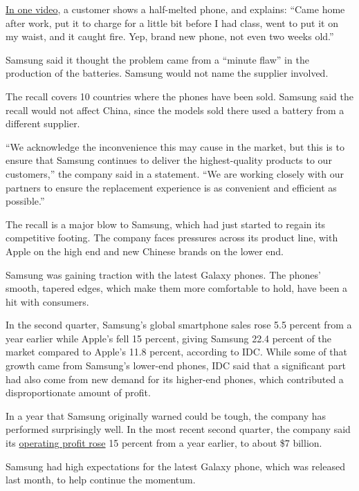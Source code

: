 \href{https://www.youtube.com/watch?v=9rScIV7m24s}{In one video}, a
customer shows a half-melted phone, and explains: ``Came home after
work, put it to charge for a little bit before I had class, went to put
it on my waist, and it caught fire. Yep, brand new phone, not even two
weeks old.''

Samsung said it thought the problem came from a ``minute flaw'' in the
production of the batteries. Samsung would not name the supplier
involved.

The recall covers 10 countries where the phones have been sold. Samsung
said the recall would not affect China, since the models sold there used
a battery from a different supplier.

``We acknowledge the inconvenience this may cause in the market, but
this is to ensure that Samsung continues to deliver the highest-quality
products to our customers,'' the company said in a statement. ``We are
working closely with our partners to ensure the replacement experience
is as convenient and efficient as possible.''

The recall is a major blow to Samsung, which had just started to regain
its competitive footing. The company faces pressures across its product
line, with Apple on the high end and new Chinese brands on the lower
end.

Samsung was gaining traction with the latest Galaxy phones. The phones'
smooth, tapered edges, which make them more comfortable to hold, have
been a hit with consumers.

In the second quarter, Samsung's global smartphone sales rose 5.5
percent from a year earlier while Apple's fell 15 percent, giving
Samsung 22.4 percent of the market compared to Apple's 11.8 percent,
according to IDC. While some of that growth came from Samsung's
lower-end phones, IDC said that a significant part had also come from
new demand for its higher-end phones, which contributed a
disproportionate amount of profit.

In a year that Samsung originally warned could be tough, the company has
performed surprisingly well. In the most recent second quarter, the
company said its
\href{http://www.nytimes3xbfgragh.onion/2016/07/08/business/samsung-profit-rises-on-new-smartphone-screen-technology.html}{operating
profit rose} 15 percent from a year earlier, to about \$7 billion.

Samsung had high expectations for the latest Galaxy phone, which was
released last month, to help continue the momentum.

